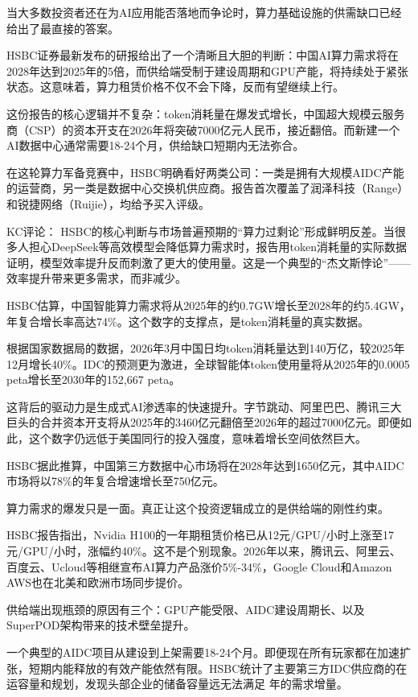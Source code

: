 \documentclass[11pt]{ctexart}
\begin{document}
当大多数投资者还在为AI应用能否落地而争论时，算力基础设施的供需缺口已经给出了最直接的答案。

HSBC证券最新发布的研报给出了一个清晰且大胆的判断：中国AI算力需求将在2028年达到2025年的5倍，而供给端受制于建设周期和GPU产能，将持续处于紧张状态。这意味着，算力租赁价格不仅不会下降，反而有望继续上行。

这份报告的核心逻辑并不复杂：token消耗量在爆发式增长，中国超大规模云服务商（CSP）的资本开支在2026年将突破7000亿元人民币，接近翻倍。而新建一个AI数据中心通常需要18-24个月，供给缺口短期内无法弥合。

在这轮算力军备竞赛中，HSBC明确看好两类公司：一类是拥有大规模AIDC产能的运营商，另一类是数据中心交换机供应商。报告首次覆盖了润泽科技（Range）和锐捷网络（Ruijie），均给予买入评级。

KC评论： HSBC的核心判断与市场普遍预期的“算力过剩论”形成鲜明反差。当很多人担心DeepSeek等高效模型会降低算力需求时，报告用token消耗量的实际数据证明，模型效率提升反而刺激了更大的使用量。这是一个典型的“杰文斯悖论”——效率提升带来更多需求，而非减少。

HSBC估算，中国智能算力需求将从2025年的约0.7GW增长至2028年的约5.4GW，年复合增长率高达74\%。这个数字的支撑点，是token消耗量的真实数据。

根据国家数据局的数据，2026年3月中国日均token消耗量达到140万亿，较2025年12月增长40\%。IDC的预测更为激进，全球智能体token使用量将从2025年的0.0005 peta增长至2030年的152,667 peta。

这背后的驱动力是生成式AI渗透率的快速提升。字节跳动、阿里巴巴、腾讯三大巨头的合并资本开支将从2025年的3460亿元翻倍至2026年的超过7000亿元。即便如此，这个数字仍远低于美国同行的投入强度，意味着增长空间依然巨大。

HSBC据此推算，中国第三方数据中心市场将在2028年达到1650亿元，其中AIDC市场将以78\%的年复合增速增长至750亿元。

算力需求的爆发只是一面。真正让这个投资逻辑成立的是供给端的刚性约束。

HSBC报告指出，Nvidia H100的一年期租赁价格已从12元/GPU/小时上涨至17元/GPU/小时，涨幅约40\%。这不是个别现象。2026年以来，腾讯云、阿里云、百度云、Ucloud等相继宣布AI算力产品涨价5\%-34\%，Google Cloud和Amazon AWS也在北美和欧洲市场同步提价。

供给端出现瓶颈的原因有三个：GPU产能受限、AIDC建设周期长、以及SuperPOD架构带来的技术壁垒提升。

一个典型的AIDC项目从建设到上架需要18-24个月。即便现在所有玩家都在加速扩张，短期内能释放的有效产能依然有限。HSBC统计了主要第三方IDC供应商的在运容量和规划，发现头部企业的储备容量远无法满足 年的需求增量。
\end{document}
